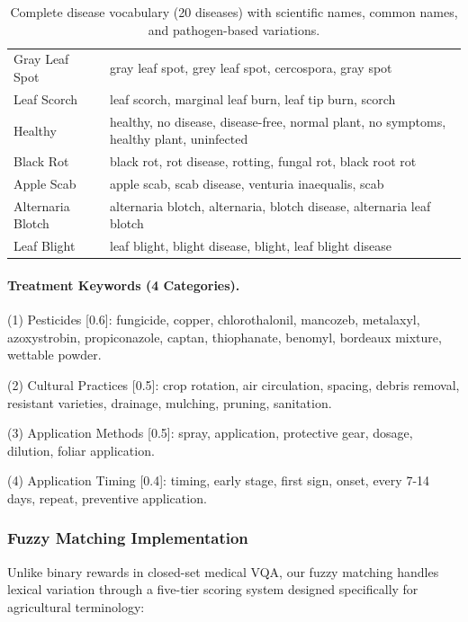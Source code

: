 \documentclass[11pt]{article}
\begin{document}
\begin{table}[t]
\begin{tabular}{lp{12cm}}
Gray Leaf Spot & gray leaf spot, grey leaf spot, cercospora, gray spot \\
Leaf Scorch & leaf scorch, marginal leaf burn, leaf tip burn, scorch \\
Healthy & healthy, no disease, disease-free, normal plant, no symptoms, healthy plant, uninfected \\
Black Rot & black rot, rot disease, rotting, fungal rot, black root rot \\
Apple Scab & apple scab, scab disease, venturia inaequalis, scab \\
Alternaria Blotch & alternaria blotch, alternaria, blotch disease, alternaria leaf blotch \\
Leaf Blight & leaf blight, blight disease, blight, leaf blight disease \\
\hline
\end{tabular}
\caption{Complete disease vocabulary (20 diseases) with scientific names, common names, and pathogen-based variations.}
\label{tab:disease_vocab_full}
\end{table}

\paragraph{Treatment Keywords (4 Categories).}

\noindent (1) Pesticides [0.6]: fungicide, copper, chlorothalonil, mancozeb, metalaxyl, azoxystrobin, propiconazole, captan, thiophanate, benomyl, bordeaux mixture, wettable powder.

\noindent (2) Cultural Practices [0.5]: crop rotation, air circulation, spacing, debris removal, resistant varieties, drainage, mulching, pruning, sanitation.

\noindent (3) Application Methods [0.5]: spray, application, protective gear, dosage, dilution, foliar application.

\noindent (4) Application Timing [0.4]: timing, early stage, first sign, onset, every 7-14 days, repeat, preventive application.

\subsubsection{Fuzzy Matching Implementation}
\label{sec:fuzzy_matching}

Unlike binary rewards in closed-set medical VQA, our fuzzy matching handles lexical variation through a five-tier scoring system designed specifically for agricultural terminology:
\end{document}
